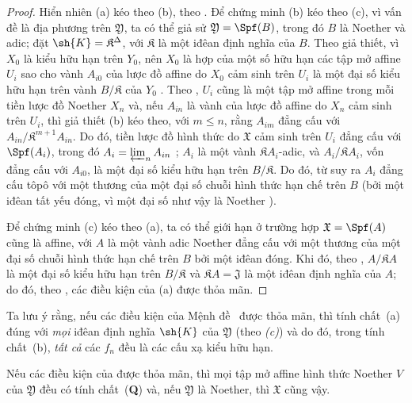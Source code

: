\documentclass[oneside]{amsart}
\renewcommand{\leq}{\leqslant}
\let\EGAOriginalLabel\label
\renewcommand{\label}[1]{\phantomsection\EGAOriginalLabel{#1}}
\begin{document}
\begin{proof}
Hiển nhiên (a) kéo theo (b), theo .
Để chứng minh (b) kéo theo (c), vì vấn đề là địa phương trên $\mathfrak{Y}$, ta có thể giả sử $\mathfrak{Y}=\Spf(B)$, trong đó $B$ là Noether và adic;
đặt $\sh{K}=\mathfrak{K}^\Delta$, với $\mathfrak{K}$ là một iđêan định nghĩa của $B$.
Theo giả thiết, vì $X_0$ là kiểu hữu hạn trên $Y_0$, nên $X_0$ là hợp của một số hữu hạn các tập mở affine $U_i$ sao cho vành $A_{i0}$ của lược đồ affine do $X_0$ cảm sinh trên $U_i$ là một đại số kiểu hữu hạn trên vành $B/\mathfrak{K}$ của $Y_0$ .
Theo , $U_i$ cũng là một tập mở affine trong mỗi tiền lược đồ Noether $X_n$ và, nếu $A_{in}$ là vành của lược đồ affine do $X_n$ cảm sinh trên $U_i$, thì giả thiết (b) kéo theo, với $m\leq n$, rằng $A_{im}$ đẳng cấu với $A_{in}/\mathfrak{K}^{m+1}A_{in}$.
Do đó, tiền lược đồ hình thức do $\mathfrak{X}$ cảm sinh trên $U_i$ đẳng cấu với $\Spf(A_i)$, trong đó $A_i=\varprojlim_n A_{in}$ ;
$A_i$ là một vành $\mathfrak{K}A_i$-adic, và $A_i/\mathfrak{K}A_i$, vốn đẳng cấu với $A_{i0}$, là một đại số kiểu hữu hạn trên $B/\mathfrak{K}$.
Do đó, từ  suy ra $A_i$ đẳng cấu tôpô với một thương của một đại số chuỗi hình thức hạn chế trên $B$ (bởi một iđêan tất yếu đóng, vì một đại số như vậy là Noether ).

Để chứng minh (c) kéo theo (a), ta có thể giới hạn ở trường hợp $\mathfrak{X}=\Spf(A)$ cũng là affine, với $A$ là một vành adic Noether đẳng cấu với một thương của một đại số chuỗi hình thức hạn chế trên $B$ bởi một iđêan đóng.
Khi đó, theo , $A/\mathfrak{K}A$ là một đại số kiểu hữu hạn trên $B/\mathfrak{K}$ và $\mathfrak{K}A=\mathfrak{J}$ là một iđêan định nghĩa của $A$; do đó, theo , các điều kiện của (a) được thỏa mãn.
\end{proof}

Ta lưu ý rằng, nếu các điều kiện của Mệnh đề~ được thỏa mãn, thì tính chất~(a) đúng với \emph{mọi} iđêan định nghĩa $\sh{K}$ của $\mathfrak{Y}$ (theo \emph{(c)}) và do đó, trong tính chất~(b), \emph{tất cả} các $f_n$ đều là các cấu xạ kiểu hữu hạn.

\begin{corollary}[10.13.2]
\label{I.10.13.2}
Nếu các điều kiện của  được thỏa mãn, thì mọi tập mở affine hình thức Noether $V$ của $\mathfrak{Y}$ đều có tính chất~(\textbf{Q}) và, nếu $\mathfrak{Y}$ là Noether, thì $\mathfrak{X}$ cũng vậy.
\end{corollary}
\end{document}
